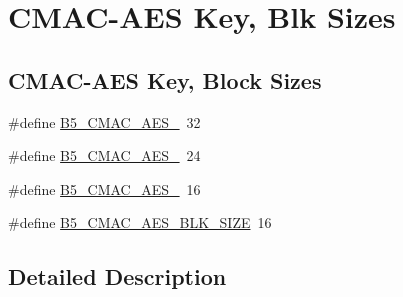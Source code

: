 \hypertarget{group__cmacaes_keys}{\section{C\-M\-A\-C-\/\-A\-E\-S Key, Blk Sizes}
\label{group__cmacaes_keys}
}
\subsection*{C\-M\-A\-C-\/\-A\-E\-S Key, Block Sizes}
\begin{DoxyCompactItemize}
\item 
\#define \hyperlink{group__cmacaes_keys_ga3d62be47b6ae3acb406589c8f6488ce6}{B5\-\_\-\-C\-M\-A\-C\-\_\-\-A\-E\-S\-\_}~32
\item 
\#define \hyperlink{group__cmacaes_keys_ga65b3f56c5c5f16e0e54f2c02f6ae0a16}{B5\-\_\-\-C\-M\-A\-C\-\_\-\-A\-E\-S\-\_}~24
\item 
\#define \hyperlink{group__cmacaes_keys_ga3101aac4d7dd544e8832937e66d1e275}{B5\-\_\-\-C\-M\-A\-C\-\_\-\-A\-E\-S\-\_}~16
\item 
\#define \hyperlink{group__cmacaes_keys_ga30efa04404b1c5062c7e0cc62e019988}{B5\-\_\-\-C\-M\-A\-C\-\_\-\-A\-E\-S\-\_\-\-B\-L\-K\-\_\-\-S\-I\-Z\-E}~16
\end{DoxyCompactItemize}


\subsection{Detailed Description}


